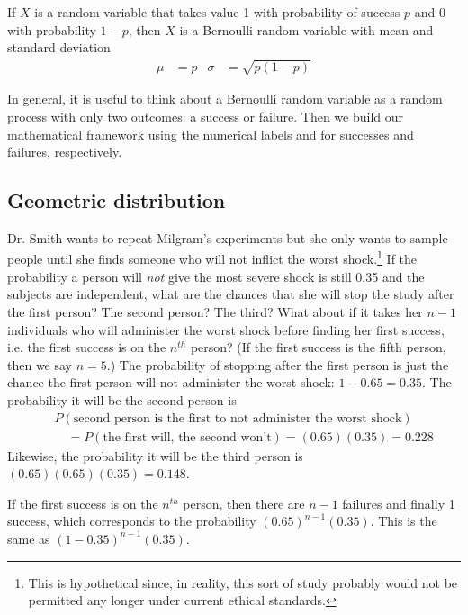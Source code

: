 \begin{termBox}{
If $X$ is a random variable that takes value 1 with probability of success $p$ and 0 with probability $1-p$, then $X$ is a Bernoulli random variable with mean and standard deviation
\begin{align*}
\mu &= p
	&\sigma&= \sqrt{p(1-p)}
\end{align*}}
\end{termBox}

In general, it is useful to think about a Bernoulli random variable as a random process with only two outcomes: a success or failure. Then we build our mathematical framework using the numerical labels  and  for successes and failures, respectively.



\subsection{Geometric distribution}


\begin{example}{Dr. Smith wants to repeat Milgram's experiments but she only wants to sample people until she finds someone who will not inflict the worst shock.\footnote{This is hypothetical since, in reality, this sort of study probably would not be permitted any longer under current ethical standards.} If the probability a person will \emph{not} give the most severe shock is still 0.35 and the subjects are independent, what are the chances that she will stop the study after the first person? The second person? The third? What about if it takes her $n-1$ individuals who will administer the worst shock before finding her first success, i.e. the first success is on the $n^{th}$ person? (If the first success is the fifth person, then we say $n=5$.)} \label{waitForShocker}
The probability of stopping after the first person is just the chance the first person will not administer the worst shock: $1-0.65=0.35$. The probability it will be the second person is
\begin{eqnarray*}
&&P(\text{second person is the first to not administer the worst shock}) \\
&&\quad = P(\text{the first will, the second won't}) = (0.65)(0.35) = 0.228
\end{eqnarray*}
Likewise, the probability it will be the third person is $(0.65)(0.65)(0.35) = 0.148$.

If the first success is on the $n^{th}$ person, then there are $n-1$ failures and finally 1 success, which corresponds to the probability $(0.65)^{n-1}(0.35)$. This is the same as $(1-0.35)^{n-1}(0.35)$.
\end{example}

